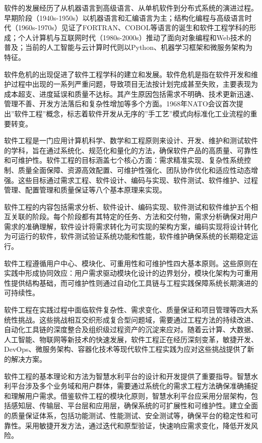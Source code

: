软件的发展经历了从机器语言到高级语言、从单机软件到分布式系统的演进过程。早期阶段（1940s-1950s）以机器语言和汇编语言为主；结构化编程与高级语言时代（1960s-1970s）见证了FORTRAN、COBOL等语言的诞生和软件工程学科的形成；个人计算机与互联网时代（1980s-2000s）推动了面向对象编程和Web技术的普及；当前的人工智能与云计算时代则以Python、机器学习框架和微服务架构为特征。

软件危机的出现促进了软件工程学科的建立和发展。软件危机是指在软件开发和维护过程中出现的一系列严重问题，导致项目无法按计划完成甚至失败，主要表现为成本超支、进度延误和质量不达标。其产生原因包括需求不明确、技术更新迅速、管理不善、开发方法落后和复杂性增加等多个方面。1968年NATO会议首次提出''软件工程''概念，标志着软件开发从无序的''手工艺''模式向标准化工业流程的重要转变。

软件工程是一门应用计算机科学、数学和工程原则来设计、开发、维护和测试软件的学科，旨在通过系统化、规范化和量化的方法，确保软件产品的高质量、可靠性和可维护性。软件工程的目标涵盖七个核心方面：需求精准实现、复杂性系统控制、质量全面保障、资源高效配置、可维护性强化、团队协作优化和适应性动态增强。这些目标通过需求工程、软件设计、编码与实现、软件测试、软件维护、过程管理、配置管理和质量保证等八个基本原理来实现。

软件工程的内容包括需求分析、软件设计、编码实现、软件测试和软件维护五个相互关联的阶段。每个阶段都有其特定的任务、方法和交付物，需求分析确保对用户需求的准确理解，软件设计将需求转化为可实现的架构方案，编码实现将设计转化为可运行的软件，软件测试验证系统功能和性能，软件维护确保系统的长期稳定运行。

软件工程遵循用户中心、模块化、可重用性和可维护性四大基本原则。这些原则在实践中形成协同效应：用户需求驱动模块化设计的边界划分，模块化架构为可重用性提供结构基础，而可维护性则通过自动化工具链与工程实践保障系统长期演进的可持续性。

软件工程在实践过程中面临软件复杂性、需求变化、质量保证和项目管理等四大系统性挑战。这些挑战相互交织形成复合型问题域，需要通过工程方法的持续改进、自动化工具链的深度整合及组织级过程资产的沉淀来应对。随着云计算、大数据、人工智能、物联网等新技术的快速发展，软件工程正在经历深刻变革，敏捷开发、DevOps、微服务架构、容器化技术等现代软件工程实践为应对这些挑战提供了新的解决方案。

软件工程的基本理论和方法为智慧水利平台的设计和开发提供了重要指导。智慧水利平台涉及多个业务域和用户群体，需要通过系统化的需求工程方法确保准确捕捉和理解用户需求。借鉴软件工程的模块化原则，智慧水利平台应采用分层架构，包括感知层、传输层、平台层和应用层，确保系统的可扩展性和可维护性。建立全面的质量保证体系，包括功能测试、性能测试、安全测试等，确保平台的稳定性和可靠性。采用敏捷开发方法，通过迭代和原型验证，快速响应需求变化，降低开发风险。


